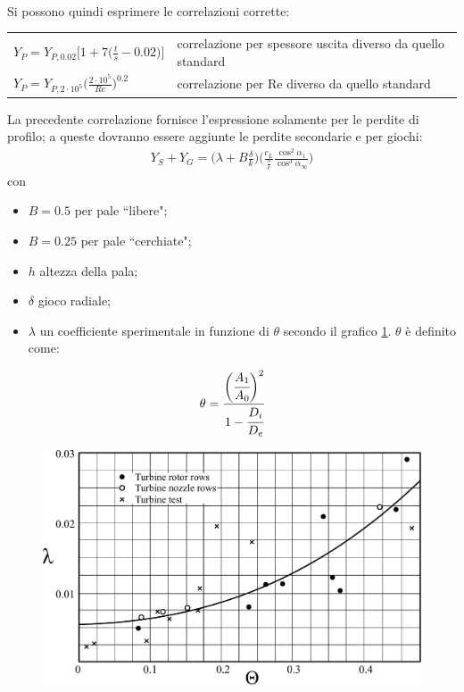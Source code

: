 \\Si possono quindi esprimere le correlazioni corrette:\\
\begin{tabular}{l l}
	$ Y_P = Y_{P,0.02} \bigg[ 1 + 7 \bigg( \frac{t}{s} - 0.02 \bigg) \bigg] $ & correlazione per spessore uscita diverso da quello standard\\
	$ Y_P = Y_{P,2 \cdot 10^5} \bigg( \frac{2 \cdot 10^5}{Re} \bigg)^{0.2} $ &  correlazione per Re diverso da quello standard\\
\end{tabular}

\vspace{0.5cm}
La precedente correlazione fornisce l'espressione solamente per le perdite di profilo; a queste dovranno essere aggiunte le perdite secondarie e per giochi:
\begin{align*}
Y_S + Y_G = \Big( \lambda + B \frac{\delta}{k} \Big) \Bigg( \frac{c_L}{\frac{s}{c}} \frac{\cos^2 \alpha_1}{\cos^3 \alpha_{\infty}} \Bigg)
\end{align*}
con
\begin{itemize}
\item $B = 0.5$ per pale ``libere";
\item $B = 0.25$ per pale ``cerchiate";
\item $h$ altezza della pala;
\item $\delta$ gioco radiale;
\item $\lambda$ un coefficiente sperimentale in funzione di $\theta$ secondo il grafico \ref{fig:lambdaPerditeSchiera}. $\theta$ è definito come:
\end{itemize}
\begin{align*}
\theta = \cfrac{\bigg(\cfrac{A_1}{A_0}\bigg)^2}{1- \cfrac{D_i}{D_e}}
\end{align*}
\begin{figure}
\centering
  \includegraphics[width=.6\textwidth]{fig/lambdaPerditeSchiera.pdf}
\caption{}
\label{fig:lambdaPerditeSchiera}
\end{figure}

